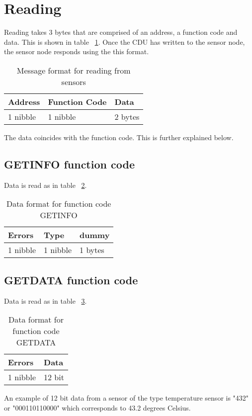 \section{Reading}
Reading takes 3 bytes that are comprised of an address, a function code and data. This is shown in table ~\ref{table:stdmsgfromsensor}. Once the CDU has written to the sensor node, the sensor node responds using the this format. \\
\begin{table}[H]
\centering
\begin{tabular}{|l|l|l|}
	\hline
	Address & Function Code & Data \\ \hline
	1 nibble & 1 nibble	& 2 bytes \\
	\hline
\end{tabular}
\caption{Message format for reading from sensors }
\label{table:stdmsgfromsensor}
\end{table}
The data coincides with the function code. This is further explained below.

\subsection{GETINFO function code}
Data is read as in table ~\ref{table:Datagetinfo}.
\begin{table}[H]
\centering
\begin{tabular}{|l|l|l|}
	\hline
	Errors & Type & dummy \\ \hline
	1 nibble & 1 nibble	& 1 bytes \\
	\hline
\end{tabular}
\caption{Data format for function code GETINFO }
\label{table:Datagetinfo}
\end{table}
\subsection{GETDATA function code}
Data is read as in table ~\ref{table:Datagetdata}.
\begin{table}[H]
\centering
\begin{tabular}{|l|l|}
	\hline
	Errors & Data \\ \hline
	1 nibble & 12 bit \\
	\hline
\end{tabular}
\caption{Data format for function code GETDATA }
\label{table:Datagetdata}
\end{table}
An example of 12 bit data from a sensor of the type temperature sensor is "432" or "000110110000" which corresponds to 43.2 degrees Celsius.

